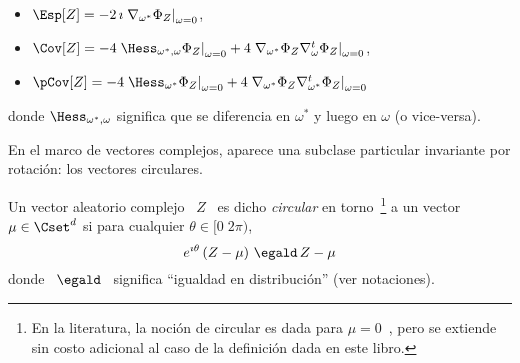 \begin{itemize}
  \begin{itemize}
  \item $\Esp[Z]  = - 2 \, \imath  \left. \nabla_{\omega^*} \Phi_Z  \right|_{\omega =
      0}$,
  \item $\Cov[Z] = - 4 \left. \Hess_{\omega^*,\omega} \Phi_Z \right|_{\omega = 0} +
    4 \left. \nabla_{\omega^*}  \Phi_Z \nabla_{\omega}^t \Phi_Z  \right|_{\omega =
      0}$,
  \item  $\pCov[Z] =  - 4 \left.  \Hess_{\omega^*}  \Phi_Z \right|_{\omega  = 0}  +
    4 \left. \nabla_{\omega^*} \Phi_Z \nabla_{\omega^*}^t \Phi_Z \right|_{\omega =
      0}$
  \end{itemize}
  donde $\Hess_{\omega^*,\omega}$  significa que  se diferencia en  $\omega^*$ y
  luego en $\omega$ (o vice-versa).
\end{itemize}

En el  marco de vectores  complejos, aparece una subclase  particular invariante
por rotaci\'on: los vectores circulares.
%
\begin{definicion}\label{Def:MP:VectorAleatorioComplejoCircular}
%
  Un  vector   aleatorio  complejo   \  $Z$  \   es  dicho  {\em   circular}  en
  torno~\footnote{En la literatura, la noci\'on  de circular es dada para $\mu =
    0$~\cite[Def.~24.3.2]{Lap17}, pero  se extiende sin costo  adicional al caso
    de la  definici\'on dada en este libro.}   a un vector $\mu  \in \Cset^d$ si
  para cualquier $\theta \in [0 \; 2 \pi)$,
  \[
  e^{\imath \theta} \left( Z - \mu \right) \, \egald \, Z - \mu
  \]
  donde \ $\egald$ \ significa ``igualdad en distribuci\'on'' (ver notaciones).
\end{definicion}


